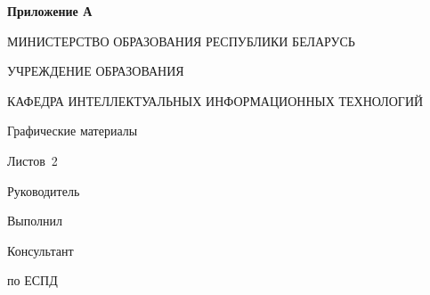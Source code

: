 \begin{flushright}
    \textbf{Приложение А}
\end{flushright}
\begin{center}
    МИНИСТЕРСТВО ОБРАЗОВАНИЯ РЕСПУБЛИКИ БЕЛАРУСЬ

    УЧРЕЖДЕНИЕ ОБРАЗОВАНИЯ

    КАФЕДРА ИНТЕЛЛЕКТУАЛЬНЫХ ИНФОРМАЦИОННЫХ ТЕХНОЛОГИЙ
\end{center}

\vfill

\begin{center}
    \TitlePageTopic
\end{center}

\vfill

\begin{center}
    Графические материалы
\end{center}

\vfill

\begin{center}
    \graphicalAttachmentSignature
\end{center}

\vfill


\begin{center}
    Листов~2
\end{center}

\vfill

\begin{flushright}
    \begin{minipage}[t]{7cm}
        Руководитель

        \vspace{4mm}

        Выполнил

        \vspace{4mm}

        Консультант

        по ЕСПД
    \end{minipage}
    \begin{minipage}[t]{7cm}
        \titlePageTeacherSurname~\titlePageTeacherName

        \vspace{4mm}

        \titlePageStudentSurname~\titlePageStudentName

        \vspace{4mm}

        \titlePageTeacherSurname~\titlePageTeacherName
    \end{minipage}
\end{flushright}

\vfill

\begin{center}
    \titlePageCity~\ESKDtheYear
\end{center}


